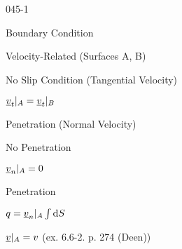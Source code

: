 \begin{mitframe}{045-1}

\begin{listone}
\item  Boundary Condition
	\begin{listtwo}
 		\item Velocity-Related (Surfaces A, B)
    		\begin{listthree}
        		\item No Slip Condition (Tangential Velocity)
            		\begin{listfour}
                    	\item $\uline{\vvel}_t|_{\helmholtz}=\uline{\vvel}_t|_{\exergy}$
                     \end{listfour}
              \item Penetration (Normal Velocity)
                  		\begin{listfour}
                                		\item No Penetration
                                        		\begin{listfive}
                                                		\item $\uline{\vvel}_{n}|_{\helmholtz}=0$
                                                \end{listfive}
                                	\item Penetration
                                    		\begin{listfive}
                                            		\item $\heatflux=\uline{\vvel}_{n}|_{\helmholtz}\int\nolimits\mathrm{d}\entropy$
                                                    \item $\uline{\vvel}|_{\helmholtz}=\vvel$  (ex. 6.6-2. p. 274 (Deen))
                                                

\end{listfive}
\end{listfour}
\end{listthree}
\end{listtwo}
\end{listone}
\end{mitframe}
